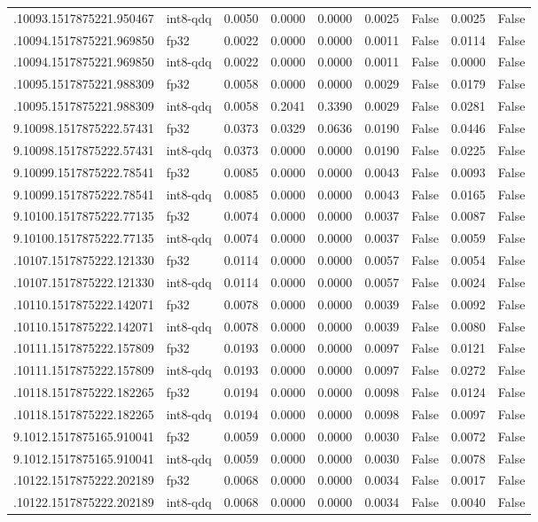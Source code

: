 \begin{tabular}{llrrrrrrr}
.10093.1517875221.950467 & int8-qdq & 0.0050 & 0.0000 & 0.0000 & 0.0025 & False & 0.0025 & False \\
.10094.1517875221.969850 & fp32 & 0.0022 & 0.0000 & 0.0000 & 0.0011 & False & 0.0114 & False \\
.10094.1517875221.969850 & int8-qdq & 0.0022 & 0.0000 & 0.0000 & 0.0011 & False & 0.0000 & False \\
.10095.1517875221.988309 & fp32 & 0.0058 & 0.0000 & 0.0000 & 0.0029 & False & 0.0179 & False \\
.10095.1517875221.988309 & int8-qdq & 0.0058 & 0.2041 & 0.3390 & 0.0029 & False & 0.0281 & False \\
9.10098.1517875222.57431 & fp32 & 0.0373 & 0.0329 & 0.0636 & 0.0190 & False & 0.0446 & False \\
9.10098.1517875222.57431 & int8-qdq & 0.0373 & 0.0000 & 0.0000 & 0.0190 & False & 0.0225 & False \\
9.10099.1517875222.78541 & fp32 & 0.0085 & 0.0000 & 0.0000 & 0.0043 & False & 0.0093 & False \\
9.10099.1517875222.78541 & int8-qdq & 0.0085 & 0.0000 & 0.0000 & 0.0043 & False & 0.0165 & False \\
9.10100.1517875222.77135 & fp32 & 0.0074 & 0.0000 & 0.0000 & 0.0037 & False & 0.0087 & False \\
9.10100.1517875222.77135 & int8-qdq & 0.0074 & 0.0000 & 0.0000 & 0.0037 & False & 0.0059 & False \\
.10107.1517875222.121330 & fp32 & 0.0114 & 0.0000 & 0.0000 & 0.0057 & False & 0.0054 & False \\
.10107.1517875222.121330 & int8-qdq & 0.0114 & 0.0000 & 0.0000 & 0.0057 & False & 0.0024 & False \\
.10110.1517875222.142071 & fp32 & 0.0078 & 0.0000 & 0.0000 & 0.0039 & False & 0.0092 & False \\
.10110.1517875222.142071 & int8-qdq & 0.0078 & 0.0000 & 0.0000 & 0.0039 & False & 0.0080 & False \\
.10111.1517875222.157809 & fp32 & 0.0193 & 0.0000 & 0.0000 & 0.0097 & False & 0.0121 & False \\
.10111.1517875222.157809 & int8-qdq & 0.0193 & 0.0000 & 0.0000 & 0.0097 & False & 0.0272 & False \\
.10118.1517875222.182265 & fp32 & 0.0194 & 0.0000 & 0.0000 & 0.0098 & False & 0.0124 & False \\
.10118.1517875222.182265 & int8-qdq & 0.0194 & 0.0000 & 0.0000 & 0.0098 & False & 0.0097 & False \\
9.1012.1517875165.910041 & fp32 & 0.0059 & 0.0000 & 0.0000 & 0.0030 & False & 0.0072 & False \\
9.1012.1517875165.910041 & int8-qdq & 0.0059 & 0.0000 & 0.0000 & 0.0030 & False & 0.0078 & False \\
.10122.1517875222.202189 & fp32 & 0.0068 & 0.0000 & 0.0000 & 0.0034 & False & 0.0017 & False \\
.10122.1517875222.202189 & int8-qdq & 0.0068 & 0.0000 & 0.0000 & 0.0034 & False & 0.0040 & False \\
\bottomrule
\end{tabular}
